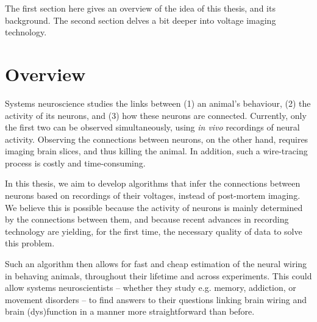 


The first section here gives an overview of the idea of this thesis, and its background. The second section delves a bit deeper into voltage imaging technology.



\section{Overview}

Systems neuroscience studies the links between (1) an animal’s behaviour, (2) the activity of its neurons, and (3) how these neurons are connected. Currently, only the first two can be observed simultaneously, using \emph{in vivo} recordings of neural activity. Observing the connections between neurons, on the other hand, requires imaging brain slices, and thus killing the animal. In addition, such a wire-tracing process is costly and time-consuming.

In this thesis, we aim to develop algorithms that infer the connections between neurons based on recordings of their voltages, instead of post-mortem imaging. We believe this is possible because the activity of neurons is mainly determined by the connections between them, and because recent advances in recording technology are yielding, for the first time, the necessary quality of data to solve this problem.

Such an algorithm then allows for fast and cheap estimation of the neural wiring in behaving animals, throughout their lifetime and across experiments. This could allow systems neuroscientists – whether they study e.g. memory, addiction, or movement disorders – to find answers to their questions linking brain wiring and brain (dys)function in a manner more straightforward than before.


